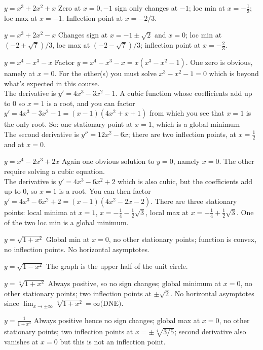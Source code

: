 \begin{multicols}{2}
\problem $\displaystyle y=x^3+2x^2+x$
\answer
Zero at $x=0, -1 $ sign only changes at $-1$;  loc min at
$x=-\frac13$; loc max at $x=-1$.  Inflection point at $x=-2/3$.
\endanswer

\problem $\displaystyle y=x^3+2x^2-x$
\answer
Changes sign at $x=-1\pm\surd2$ and $x=0$; loc min at
$(-2+\surd7)/3$, loc max at $(-2-\surd7)/3$; inflection point at
$x=-\frac23$.
\endanswer

\problem $\displaystyle y=x^4-x^3-x$
\answer
Factor $y=x^4-x^3-x=x(x^3-x^2-1)$.  One zero is obvious, namely
at $x=0$.  For the other(s) you must solve $x^3-x^2-1=0$ which is
beyond what's expected in this course.\\
The derivative is $y'=4x^3-3x^2-1$.  A cubic function whose
coefficients add up to 0 so $x=1$ is a root, and you can factor
$y'=4x^3-3x^2-1= (x-1)(4x^2+x+1)$ from which you see that $x=1$
is the only root.  So: one stationary point at $x=1$, which is a
global minimum\\
The second derivative is $y''=12x^2-6x$; there are two inflection
points, at $x=\frac12$ and at $x=0$.
\endanswer

\problem $\displaystyle y=x^4-2x^3+2x$
\answer
Again one obvious solution to $y=0$, namely $x=0$.  The other
require solving a cubic equation.\\ The derivative is
$y'=4x^3-6x^2+2$ which is also cubic, but the coefficients add up to
0, so $x=1$ is a root.  You can then factor
$y'=4x^3-6x^2+2=(x-1)(4x^2-2x-2)$.  There are three stationary
points: local minima at $x=1$, $x=-\frac14 - \frac12\surd3$, local
max at $x=-\frac14 + \frac12\surd3$.  One of the two loc min is a
global minimum.
\endanswer

\problem $\displaystyle y=\sqrt{1+x^2}$
\answer
Global min at $x=0$, no other stationary points;  function is
convex, no inflection points.  No horizontal asymptotes.
\endanswer

\problem $\displaystyle y=\sqrt{1-x^2}$
\answer
The graph is the upper half of the unit circle.
\endanswer

\problem $\displaystyle y=\sqrt[4]{1+x^2}$
\answer
Always positive, so no sign changes;  global minimum at $x=0$, no
other stationary points; two inflection points at $\pm\surd2$.  No
horizontal asymptotes since $\lim_{x\to\pm\infty} \sqrt[4]{1+x^2} =
\infty \textrm{(DNE)}$.
\endanswer

\problem $\displaystyle y=\frac1{1+x^4} $
\answer
Always positive hence no sign changes; global max at $x=0$, no other
stationary points;  two inflection points at $x=\pm\sqrt[4]{3/5}$;
second derivative also vanishes at $x=0$ but this is not an
inflection point. 
\endanswer



\end{multicols}
